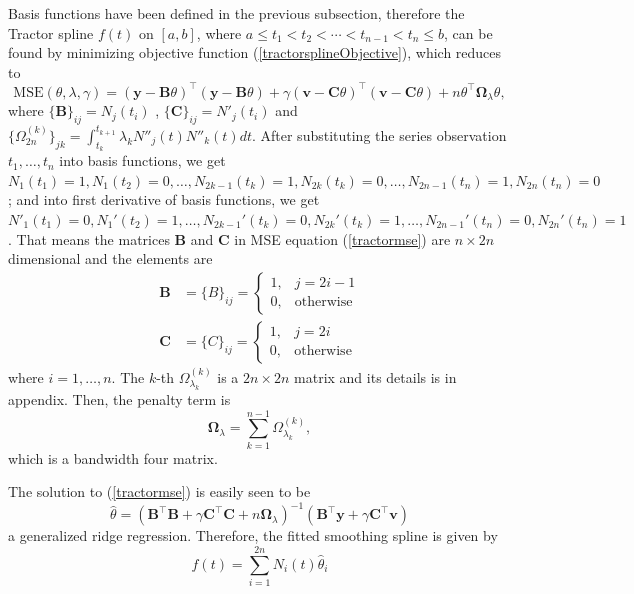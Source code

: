 Basis functions have been defined in the previous subsection, therefore the Tractor spline $f(t)$ on $[a,b]$, where $a \leq t_1 < t_2< \cdots < t_{n-1}<t_n \leq b$, can be found by minimizing  objective function (\ref{tractorsplineObjective}), which reduces to
\begin{equation}\label{tractormse}
\text{MSE}(\theta, \lambda,\gamma) = (\mathbf{y}-\mathbf{B}\theta)^\top (\mathbf{y}-\mathbf{B}\theta) +\gamma (\mathbf{v}-\mathbf{C}\theta)^\top (\mathbf{v}-\mathbf{C}\theta)+n \theta^\top\mathbf{\Omega}_{\lambda}\theta,
\end{equation}
where $\{\mathbf{B}\}_{ij} = N_j(t_i)$ , $\{\mathbf{C}\}_{ij} = N'_j(t_i)$ and $\{\Omega_{2n}^{(k)} \}_{jk}=\int_{t_k}^{t_{k+1}}\lambda_k N''_j(t)N''_k(t)dt$. After substituting the series observation $t_1, \ldots, t_n$ into basis functions, we get $N_1(t_1)=1, N_1(t_2)=0, \ldots, N_{2k-1}(t_{k})=1, N_{2k}(t_{k})=0, \ldots, N_{2n-1}(t_n)=1, N_{2n}(t_n)=0$; and into first derivative of basis functions, we get $N'_1(t_1)=0, N_1'(t_2)=1, \ldots, N_{2k-1}'(t_{k})=0, N_{2k}'(t_{k})=1, \ldots, N_{2n-1}'(t_n)=0, N_{2n}'(t_n)=1$. That means the matrices $\mathbf{B}$ and $\mathbf{C}$ in MSE equation (\ref{tractormse}) are $n \times 2n$ dimensional and the elements are
\begin{align}
\mathbf{B}&=\{B\}_{ij}=\begin{cases}
1, & j=2i-1\\
0, & \mbox{otherwise}
\end{cases}\\
\mathbf{C}&=\{C\}_{ij}=\begin{cases}
1, & j=2i\\
0, & \mbox{otherwise}
\end{cases}
\end{align}
where $i=1, \ldots, n$.  The $k$-th $\Omega_{\lambda_k}^{(k)}$ is a $2n \times 2n$ matrix and its details is in appendix. Then, the penalty term is
\begin{equation}
\mathbf{\Omega}_\lambda=\sum_{k=1}^{n-1}\Omega_{\lambda_k}^{(k)},
\end{equation}
which is a bandwidth four matrix.


The solution to (\ref{tractormse}) is easily seen to be
\begin{equation}\label{thetahat}
\hat{\theta}=(\mathbf{B}^\top\mathbf{B}+\gamma\mathbf{C}^\top\mathbf{C}+n\mathbf{\Omega}_{\lambda})^{-1}(\mathbf{B}^\top\mathbf{y}+\gamma\mathbf{C}^\top\mathbf{v})
\end{equation}
a generalized ridge regression. Therefore, the fitted smoothing spline is given by
\begin{equation}
\hat{f}(t)=\sum_{i=1}^{2n}N_i(t)\hat{\theta}_i
\end{equation}

